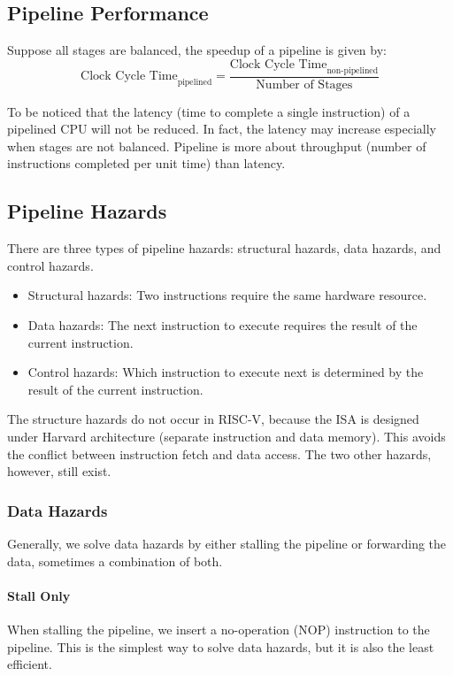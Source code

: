 \documentclass[a4paper,12pt]{article}
\begin{document}
\subsection{Pipeline Performance}
\label{sec:pipeline-performance}

Suppose all stages are balanced, the speedup of a pipeline is given by:
\begin{equation*}
	\text{Clock Cycle Time}_{\text{pipelined}} = \frac{\text{Clock Cycle Time}_{\text{non-pipelined}}}{\text{Number of Stages}}
\end{equation*}

To be noticed that the latency (time to complete a single instruction) of a pipelined CPU will not be reduced. In fact, the latency may increase especially when stages are not balanced. Pipeline is more about throughput (number of instructions completed per unit time) than latency.

\subsection{Pipeline Hazards}

There are three types of pipeline hazards: structural hazards, data hazards, and control hazards.
\begin{itemize}
	\item Structural hazards: Two instructions require the same hardware resource.
	\item Data hazards: The next instruction to execute requires the result of the current instruction.
	\item Control hazards: Which instruction to execute next is determined by the result of the current instruction.
\end{itemize}

The structure hazards do not occur in RISC-V, because the ISA is designed under Harvard architecture (separate instruction and data memory). This avoids the conflict between instruction fetch and data access. The two other hazards, however, still exist.

\subsubsection{Data Hazards}

Generally, we solve data hazards by either stalling the pipeline or forwarding the data, sometimes a combination of both.

\paragraph{Stall Only} When stalling the pipeline, we insert a no-operation (NOP) instruction to the pipeline. This is the simplest way to solve data hazards, but it is also the least efficient.
\end{document}
